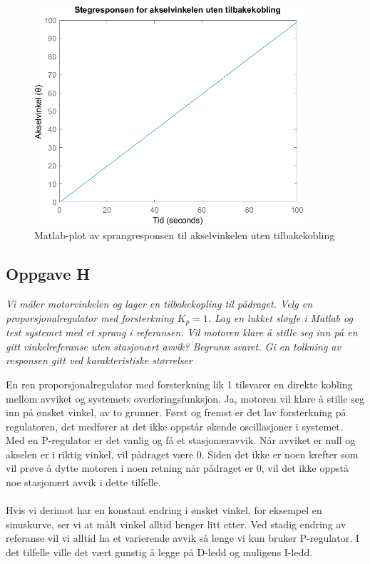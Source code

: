 \begin{figure}[h]
	\centering
	\includegraphics[width=100mm]{Images/g_StepResponse.png}
	\caption{Matlab-plot av sprangresponsen til akselvinkelen uten tilbakekobling}
	\label{fig:step_unstable}
\end{figure}


\subsection{Oppgave H}

\emph{Vi måler motorvinkelen og lager en tilbakekopling til pådraget. Velg en proporsjonalregulator med forsterkning $K_p = 1$. Lag en lukket sløyfe i Matlab og test systemet med et sprang i referansen. Vil motoren klare å stille seg inn på en gitt vinkelreferanse uten stasjonært avvik? Begrunn svaret. Gi en tolkning av responsen gitt ved karakteristiske størrelser}

En ren proporsjonalregulator med forsterkning lik 1 tilsvarer en direkte kobling mellom avviket og systemets overføringsfunksjon.
Ja, motoren vil klare å stille seg inn på ønsket vinkel, av to grunner. Først og fremst er det lav forsterkning på regulatoren, det medfører at det ikke oppstår økende oscillasjoner i systemet. \\Med en P-regulator er det vanlig og få et stasjonæravvik. Når avviket er null og akselen er i riktig vinkel, vil pådraget være 0. Siden det ikke er noen krefter som vil prøve å dytte motoren i noen retning når pådraget er 0, vil det ikke oppstå noe stasjonært avvik i dette tilfelle. \\\\Hvis vi derimot har en konstant endring i ønsket vinkel, for eksempel en sinuskurve, ser vi at målt vinkel alltid henger litt etter. Ved stadig endring av referanse vil vi alltid ha et varierende avvik så lenge vi kun bruker P-regulator. I det tilfelle ville det vært gunstig å legge på D-ledd og muligens I-ledd.
    
